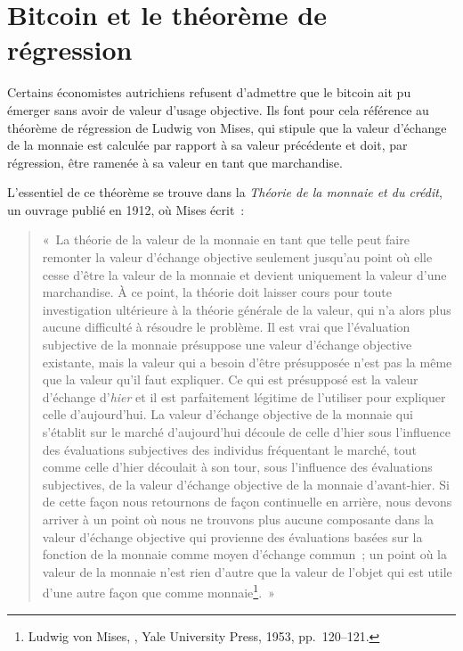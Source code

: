 \section*{Bitcoin et le théorème de régression}

Certains économistes autrichiens refusent d'admettre que le bitcoin ait pu émerger sans avoir de valeur d'usage objective. Ils font pour cela référence au théorème de régression de Ludwig von Mises, qui stipule que la valeur d'échange de la monnaie est calculée par rapport à sa valeur précédente et doit, par régression, être ramenée à sa valeur en tant que marchandise.

L'essentiel de ce théorème se trouve dans la \emph{Théorie de la monnaie et du crédit}, un ouvrage publié en 1912, où Mises écrit~: 

\begin{quote}
«~La théorie de la valeur de la monnaie en tant que telle peut faire remonter la valeur d'échange objective seulement jusqu'au point où elle cesse d'être la valeur de la monnaie et devient uniquement la valeur d'une marchandise. À ce point, la théorie doit laisser cours pour toute investigation ultérieure à la théorie générale de la valeur, qui n'a alors plus aucune difficulté à résoudre le problème. Il est vrai que l'évaluation subjective de la monnaie présuppose une valeur d'échange objective existante, mais la valeur qui a besoin d'être présupposée n'est pas la même que la valeur qu'il faut expliquer. Ce qui est présupposé est la valeur d'échange d'\emph{hier} et il est parfaitement légitime de l'utiliser pour expliquer celle d'aujourd'hui. La valeur d'échange objective de la monnaie qui s'établit sur le marché d'aujourd'hui découle de celle d'hier sous l'influence des évaluations subjectives des individus fréquentant le marché, tout comme celle d'hier découlait à son tour, sous l'influence des évaluations subjectives, de la valeur d'échange objective de la monnaie d'avant-hier.
\clearpage
Si de cette façon nous retournons de façon continuelle en arrière, nous devons arriver à un point où nous ne trouvons plus aucune composante dans la valeur d'échange objective qui provienne des évaluations basées sur la fonction de la monnaie comme moyen d'échange commun~; un point où la valeur de la monnaie n'est rien d'autre que la valeur de l'objet qui est utile d'une autre façon que comme monnaie\footnote{Ludwig von Mises, , Yale University Press, 1953, pp.~120--121.}.~» %
\end{quote}
 

